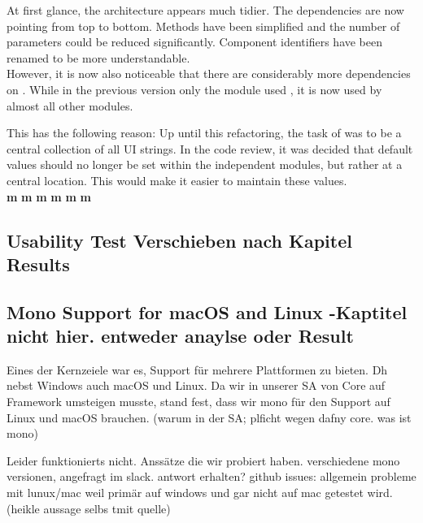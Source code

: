 At first glance, the architecture appears much tidier.
The dependencies are now pointing from top to bottom.
Methods have been simplified and the number of parameters could be reduced significantly.
Component identifiers have been renamed to be more understandable. \\

However, it is now also noticeable that there are considerably more dependencies on .
While in the previous version only the module  used , it is now used by almost all other modules.

This has the following reason: Up until this refactoring, the task of  was to be a central collection of all UI strings. 
In the code review, it was decided that default values should no longer be set within the independent modules,
but rather at a central location.
This would make it easier to maintain these values. \\



\textbf{m}
\textbf{m}
\textbf{m}
\textbf{m}
\textbf{m}
\textbf{m}



\subsection{Usability Test Verschieben nach Kapitel Results}


\subsection{Mono Support for macOS and Linux -Kaptitel nicht hier. entweder anaylse oder Result}
Eines der Kernzeiele war es, Support für mehrere Plattformen zu bieten. Dh nebst Windows auch macOS und Linux.
Da wir in unserer SA von Core auf Framework umsteigen musste, stand fest, dass wir mono für den Support auf Linux und macOS brauchen.
(warum in der SA; plficht wegen dafny core. was ist mono)

Leider funktionierts nicht.
Anssätze die wir probiert haben. verschiedene mono versionen, angefragt im slack. antwort erhalten?
github issues: allgemein probleme mit lunux/mac weil primär auf windows und gar nicht auf mac getestet wird. (heikle aussage selbs tmit quelle)

\cite{sa}
\cite{mono-slack}
\cite{mono-git}
